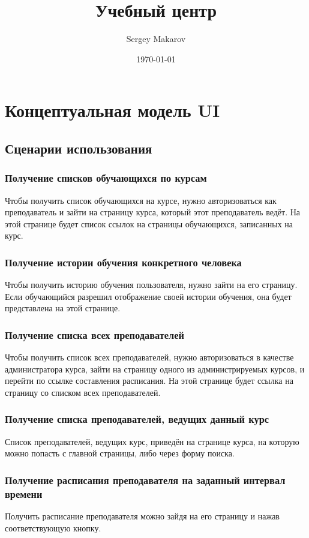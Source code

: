 \documentclass[11pt]{article}
\author{Sergey Makarov}
\date{\today}
\title{Учебный центр}
\begin{document}
\maketitle
\tableofcontents

\section{Концептуальная модель UI}
\label{sec:org12254ae}
\subsection{Сценарии использования}
\label{sec:orge230e87}
\subsubsection{Получение списков обучающихся по курсам}
\label{sec:org8f7beba}
Чтобы получить список обучающихся на курсе, нужно авторизоваться как преподаватель и зайти
на страницу курса, который этот преподаватель ведёт. На этой странице будет список ссылок на
страницы обучающихся, записанных на курс.
\subsubsection{Получение истории обучения конкретного человека}
\label{sec:orgae300a9}
Чтобы получить историю обучения пользователя, нужно зайти на его страницу. Если обучающийся
разрешил отображение своей истории обучения, она будет представлена на этой странице.
\subsubsection{Получение списка всех преподавателей}
\label{sec:org46bf502}
Чтобы получить список всех преподавателей, нужно авторизоваться в качестве администратора курса,
зайти на страницу одного из администрируемых курсов, и перейти по ссылке составления расписания.
На этой странице будет ссылка на страницу со списком всех преподавателей.
\subsubsection{Получение списка преподавателей, ведущих данный курс}
\label{sec:org35b184f}
Список преподавателей, ведущих курс, приведён на странице курса, на которую можно попасть
с главной страницы, либо через форму поиска.
\subsubsection{Получение расписания преподавателя на заданный интервал времени}
\label{sec:orgbb33c16}
Получить расписание преподавателя можно зайдя на его страницу и нажав соответствующую кнопку.
\end{document}
